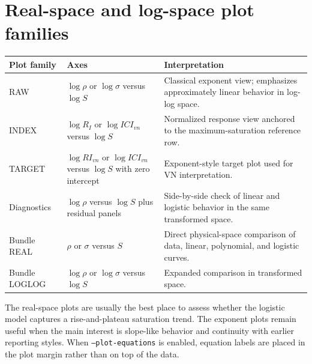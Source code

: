 \documentclass[11pt]{article}
\begin{document}
\section{Real-space and log-space plot families}
\begin{longtable}{p{} p{} p{}}
\toprule
\textbf{Plot family} & \textbf{Axes} & \textbf{Interpretation}\\
\midrule
\endhead
RAW & $\log\rho$ or $\log\sigma$ versus $\log S$ & Classical exponent view; emphasizes approximately linear behavior in log-log space.\\
INDEX & $\log R_I$ or $\log ICI_{vn}$ versus $\log S$ & Normalized response view anchored to the maximum-saturation reference row.\\
TARGET & $\log RI_{vn}$ or $\log ICI_{vn}$ versus $\log S$ with zero intercept & Exponent-style target plot used for VN interpretation.\\
Diagnostics & $\log\rho$ versus $\log S$ plus residual panels & Side-by-side check of linear and logistic behavior in the same transformed space.\\
Bundle REAL & $\rho$ or $\sigma$ versus $S$ & Direct physical-space comparison of data, linear, polynomial, and logistic curves.\\
Bundle LOGLOG & $\log\rho$ or $\log\sigma$ versus $\log S$ & Expanded comparison in transformed space.\\
\bottomrule
\end{longtable}

The real-space plots are usually the best place to assess whether the logistic model captures a rise-and-plateau saturation trend. The exponent plots remain useful when the main interest is slope-like behavior and continuity with earlier reporting styles. When \texttt{--plot-equations} is enabled, equation labels are placed in the plot margin rather than on top of the data.
\end{document}
